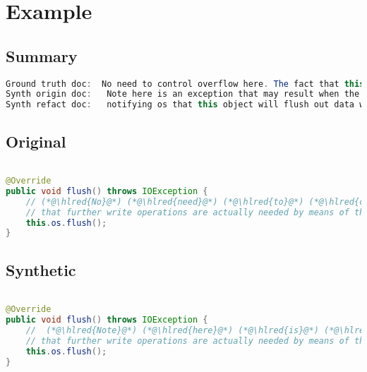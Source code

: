 \documentclass[11pt]{article}
\DeclareRobustCommand{\hlred}[1]{{\sethlcolor{YellowOrange}\hl{#1}}}
\begin{document}
  \pagebreak
  \section{Example}
  \subsection{Summary}

  \begin{lstlisting}[language=java]
Ground truth doc:  No need to control overflow here. The fact that this has overflow will be used as a flag to determine
Synth origin doc:   Note here is an exception that may result when the implementation checks whether and if the operation succeeds to
Synth refact doc:   notifying os that this object will flush out data without notice and informing that we can detect when
  \end{lstlisting}

  \subsection{Original}
  \begin{lstlisting}[language=java]

@Override
public void flush() throws IOException {
    // (*@\hlred{No}@*) (*@\hlred{need}@*) (*@\hlred{to}@*) (*@\hlred{control}@*) (*@\hlred{overflow}@*) (*@\hlred{here.}@*) (*@\hlred{The}@*) (*@\hlred{fact}@*) (*@\hlred{that}@*) (*@\hlred{this}@*) (*@\hlred{has}@*) (*@\hlred{overflow}@*) (*@\hlred{will}@*) (*@\hlred{be}@*) (*@\hlred{used}@*) (*@\hlred{as}@*) (*@\hlred{a}@*) (*@\hlred{flag}@*) to(*@\hlred{ determine}@*)
    // that further write operations are actually needed by means of the isOverflown() method.
    this.os.flush();
}
  \end{lstlisting}
  \subsection{Synthetic}

  \begin{lstlisting}[language=java]

@Override
public void flush() throws IOException {
    //  (*@\hlred{Note}@*) (*@\hlred{here}@*) (*@\hlred{is}@*) (*@\hlred{an}@*) (*@\hlred{exception}@*) (*@\hlred{that}@*) (*@\hlred{may}@*) (*@\hlred{result}@*) (*@\hlred{when}@*) (*@\hlred{the}@*) (*@\hlred{implementation}@*) (*@\hlred{checks}@*) (*@\hlred{whether}@*) (*@\hlred{and}@*) (*@\hlred{if}@*) (*@\hlred{the}@*) (*@\hlred{operation}@*) (*@\hlred{succeeds}@*) to
    // that further write operations are actually needed by means of the isOverflown() method.
    this.os.flush();
}
  \end{lstlisting}
\end{document}
